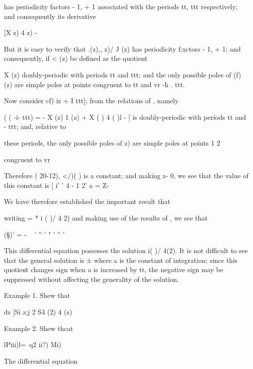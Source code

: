 has periodicity factors - 1, + 1 associated with the periods tt, ttt
respectively; and consequently its derivative

[X z) 4 z) - %

But it is easy to verify that .(z),, z)/ J (z) has periodicity
f;xctors - 1, + 1; and consequently, if < (z) be defined as the
quotient

 X (z) %
doubly-periodic with periods tt and ttt; and the only possible poles
of (f) (z) are simple poles at points congruent to tt and vr -h . ttt.

Now consider cf) iz + I ttt]; from the relations of , namely



( ( -i- ttt) = - X (z) 1 (z) + X ( ) 4 ( )l - [%
is doubly-periodic with periods tt and - ttt; and, relative to

these periods, the only possible poles of z) are simple poles at
points 1 2

congruent to vr

%
%

Therefore ( 20-12), </)( ) is a constant; and making z- 0, we see that
the value of this constant is [ i' ' 4 - 1 2' a = Z-

We have therefore established the important result that

writing = * i ( )/ 4 2) and making use of the results of , we
see that

(§)' = - ~ ' '' ' " ' '' '

This differential equation possesses the solution i( )/ 4(2). It is
not difficult to see that the general solution is ±%
where a is the constant of integration; since this quotient changes
sign when a is increased by tt, the negative sign may be suppressed
without affecting the generality of the solution.

Example 1. Shew that

dz [Si z;j 2 S4 (2) 4 (z)

Example 2. Shew thcat

lPiii)l=\ q2 ii?) Mi)

The differential equation

